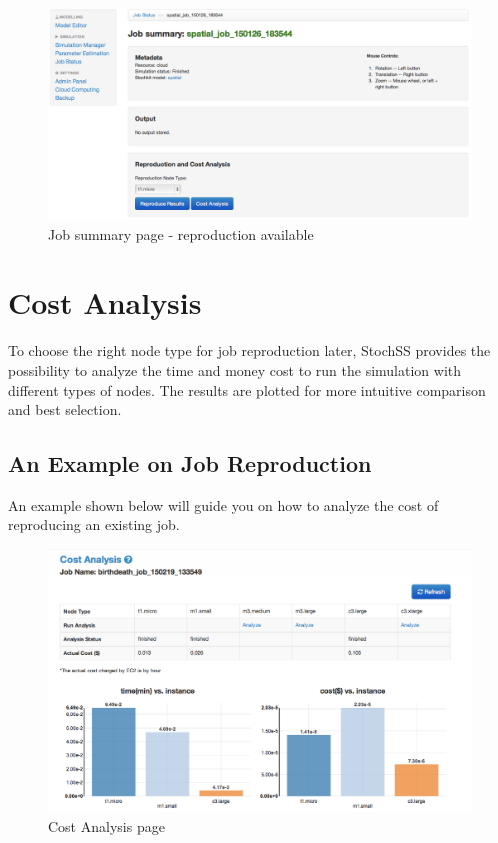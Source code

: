 \begin{figure}[!ht]
\centering
\includegraphics[scale=0.35]{T6/T6_fig_reproduction1.png}
\caption{Job summary page - reproduction available}
\label{fig:2}
\end{figure}

\newpage

\section{Cost Analysis}
To choose the right node type for job reproduction later, StochSS provides the possibility to analyze the time and money cost to run the simulation with different types of nodes. The results are plotted for more intuitive comparison and best selection.

\subsection{An Example on Job Reproduction}
An example shown below will guide you on how to analyze the cost of reproducing an existing job.

\begin{figure}[!ht]
\centering
\includegraphics[scale=0.30]{T6/T6_fig_costanalysis.png}
\caption{Cost Analysis page}
\label{fig:2}
\end{figure}

